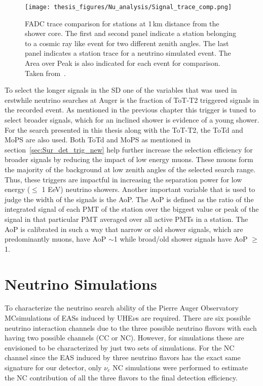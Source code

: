 \begin{figure}[t!]
  \centering
  \texttt{[image: thesis\_figures/Nu\_analysis/Signal\_trace\_comp.png]}
  \caption{FADC trace comparison for stations at 1\,km distance from the shower core. The first and second panel indicate a station belonging to a cosmic ray like event for two different zenith angles. The last panel indicates a station trace for a neutrino simulated event. The Area over Peak is also indicated for each event for comparison. Taken from~\cite{Aab_2019_diffuse}.}
  \label{fig:Signal_trace_comp}
\end{figure}

To select the longer signals in the SD one of the variables that was used in erstwhile neutrino searches at Auger is the fraction of ToT-T2 triggered signals in the recorded event. As mentioned in the previous chapter this trigger is tuned to select broader signals, which for an inclined shower is evidence of a young shower. For the search presented in this thesis along with the ToT-T2, the ToTd and MoPS are also used. Both ToTd and MoPS as mentioned in section~\ref{sec:Sur_det_trig_new} help further increase the selection efficiency for broader signals by reducing the impact of low energy muons. These muons form the majority of the background at low zenith angles of the selected search range. Thus, these triggers are impactful in increasing the separation power for low energy ($\leq$ 1 EeV) neutrino showers. Another important variable that is used to judge the width of the signals is the \gls{AoP}. The AoP is defined as the ratio of the integrated signal of each PMT of the station over the biggest value or peak of the signal in that particular PMT averaged over all active PMTs in a station. The AoP is calibrated in such a way that narrow or old shower signals, which are predominantly muons, have AoP $\sim$1 while broad/old shower signals have AoP $\geqslant$ 1. 

\section{Neutrino Simulations}
\label{sec:sim_DGL}
To characterize the neutrino search ability of the Pierre Auger Observatory \gls{MC}simulations of EASs induced by UHE$\nu$s are required. There are six possible neutrino interaction channels due to the three possible neutrino flavors with each having two possible channels (CC or NC). However, for simulations these are envisioned to be characterized by just two sets of simulations. For the NC channel since the EAS induced by three neutrino flavors has the exact same signature for our detector, only $\nu_e$ NC simulations were performed to estimate the NC contribution of all the three flavors to the final detection efficiency. 

